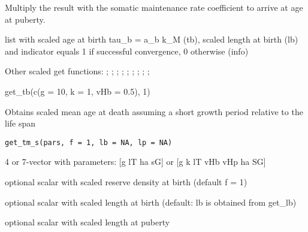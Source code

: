 \documentclass[a4paper]{book}
\begin{document}
%
\begin{Details}\relax
Multiply the result with the somatic maintenance rate coefficient to arrive at age at puberty.
\end{Details}
%
\begin{Value}
list with scaled age at birth tau\_b = a\_b k\_M (tb), scaled length at birth (lb)
and indicator equals 1 if successful convergence, 0 otherwise (info)
\end{Value}
%
\begin{SeeAlso}\relax
Other scaled get functions: ;
; ;
; ;
; ;
;
;
\end{SeeAlso}
%
\begin{Examples}
\begin{ExampleCode}
get_tb(c(g = 10, k = 1, vHb = 0.5), 1)
\end{ExampleCode}
\end{Examples}
%
\begin{Description}\relax
Obtains scaled mean age at death assuming a short growth period relative to the life span
\end{Description}
%
\begin{Usage}
\begin{verbatim}
get_tm_s(pars, f = 1, lb = NA, lp = NA)
\end{verbatim}
\end{Usage}
%
\begin{Arguments}
\begin{ldescription}
\item[\code{pars}] 4 or 7-vector with parameters: [g lT ha sG] or [g k lT vHb vHp ha SG]

\item[\code{f}] optional scalar with scaled reserve density at birth (default f = 1)

\item[\code{lb}] optional scalar with scaled length at birth (default: lb is obtained from get\_lb)

\item[\code{lp}] optional scalar with scaled length at puberty
\end{ldescription}
\end{Arguments}
\end{document}
